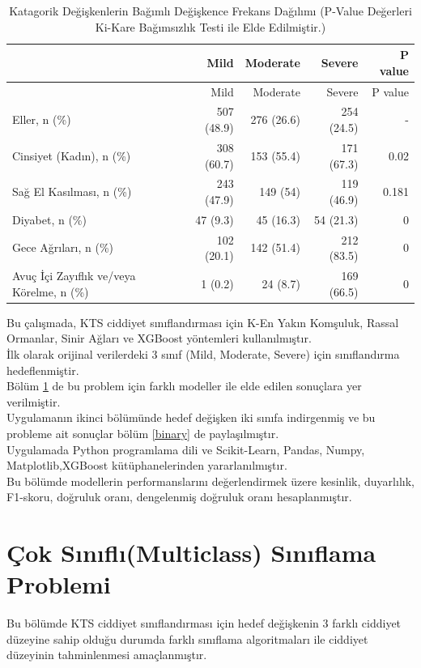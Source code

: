 \documentclass[12pt,twoside]{deuthesis}
\begin{document}
\begin{longtable}[]{@{}lrrrr@{}}
\caption{\label{tab:catvar} Katagorik Değişkenlerin Bağımlı Değişkence Frekans Dağılımı \tiny (P-Value Değerleri Ki-Kare Bağımsızlık Testi ile Elde Edilmiştir.)}\tabularnewline
\toprule
& Mild & Moderate & Severe & P value \\
\midrule
\endfirsthead
\toprule
& Mild & Moderate & Severe & P value \\
\midrule
\endhead
Eller, n (\%) & 507 (48.9) & 276 (26.6) & 254 (24.5) & - \\
Cinsiyet (Kadın), n (\%) & 308 (60.7) & 153 (55.4) & 171 (67.3) & 0.02 \\
Sağ El Kasılması, n (\%) & 243 (47.9) & 149 (54) & 119 (46.9) & 0.181 \\
Diyabet, n (\%) & 47 (9.3) & 45 (16.3) & 54 (21.3) & 0 \\
Gece Ağrıları, n (\%) & 102 (20.1) & 142 (51.4) & 212 (83.5) & 0 \\
Avuç İçi Zayıflık ve/veya Körelme, n (\%) & 1 (0.2) & 24 (8.7) & 169 (66.5) & 0 \\
\bottomrule
\end{longtable}
Bu çalışmada, KTS ciddiyet sınıflandırması için K-En Yakın Komşuluk, Rassal Ormanlar, Sinir Ağları ve XGBoost yöntemleri kullanılmıştır.\\
İlk olarak orijinal verilerdeki 3 sınıf (Mild, Moderate, Severe) için sınıflandırma hedeflenmiştir.\\
Bölüm \ref{multiclass} de bu problem için farklı modeller ile elde edilen sonuçlara yer verilmiştir.\\
Uygulamanın ikinci bölümünde hedef değişken iki sınıfa indirgenmiş ve bu probleme ait sonuçlar bölüm \ref{binary} de paylaşılmıştır.\\
Uygulamada Python programlama dili ve Scikit-Learn, Pandas, Numpy, Matplotlib,XGBoost kütüphanelerinden yararlanılmıştır.\\
Bu bölümde modellerin performanslarını değerlendirmek üzere kesinlik, duyarlılık, F1-skoru, doğruluk oranı, dengelenmiş doğruluk oranı hesaplanmıştır.

\hypertarget{multiclass}{%
\section{Çok Sınıflı(Multiclass) Sınıflama Problemi}\label{multiclass}}

Bu bölümde KTS ciddiyet sınıflandırması için hedef değişkenin 3 farklı ciddiyet düzeyine sahip olduğu durumda farklı sınıflama algoritmaları ile ciddiyet düzeyinin tahminlenmesi amaçlanmıştır.
\end{document}
